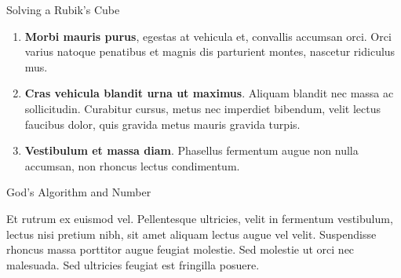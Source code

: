 \documentclass[final]{beamer}
\newlength{\colwidth}
\begin{document}
\begin{frame}[t]
\begin{columns}[t]
\begin{column}{\colwidth}
\begin{block}{Solving a Rubik's Cube}
    \begin{enumerate}
      \item \textbf{Morbi mauris purus}, egestas at vehicula et, convallis
        accumsan orci. Orci varius natoque penatibus et magnis dis parturient
        montes, nascetur ridiculus mus.
      \item \textbf{Cras vehicula blandit urna ut maximus}. Aliquam blandit nec
        massa ac sollicitudin. Curabitur cursus, metus nec imperdiet bibendum,
        velit lectus faucibus dolor, quis gravida metus mauris gravida turpis.
      \item \textbf{Vestibulum et massa diam}. Phasellus fermentum augue non
        nulla accumsan, non rhoncus lectus condimentum.
    \end{enumerate}

  \end{block}

  \begin{block}{God's Algorithm and Number}

    \large Et rutrum ex euismod vel. Pellentesque ultricies, velit in fermentum
    vestibulum, lectus nisi pretium nibh, sit amet aliquam lectus augue vel
    velit. Suspendisse rhoncus massa porttitor augue feugiat molestie. Sed
    molestie ut orci nec malesuada. Sed ultricies feugiat est fringilla
    posuere. \\
    \begin{center}
    \end{center}


\end{block}
\end{column}
\end{columns}
\end{frame}
\end{document}
